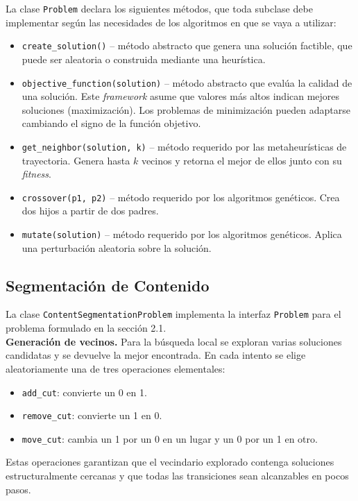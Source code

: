 \documentclass[letterpaper, 12pt]{report}
\begin{document}
La clase \texttt{Problem} declara los siguientes métodos, que toda subclase debe implementar según las necesidades de los algoritmos en que se vaya a utilizar:
\begin{itemize}
    \item \texttt{create\_solution()} -- método abstracto que genera una solución factible, que puede ser aleatoria o construida mediante una heurística.
    \item \texttt{objective\_function(solution)} -- método abstracto que evalúa la calidad de una solución. Este \textit{framework} asume que valores más altos indican mejores soluciones (maximización). Los problemas de minimización pueden adaptarse cambiando el signo de la función objetivo.
    \item \texttt{get\_neighbor(solution, k)} -- método requerido por las metaheurísticas de trayectoria. Genera hasta \(k\) vecinos y retorna el mejor de ellos junto con su \textit{fitness}.
    \item \texttt{crossover(p1, p2)} -- método requerido por los algoritmos genéticos. Crea dos hijos a partir de dos padres.
    \item \texttt{mutate(solution)} -- método requerido por los algoritmos genéticos. Aplica una perturbación aleatoria sobre la solución.
\end{itemize}


\subsection{Segmentación de Contenido}

La clase \texttt{ContentSegmentationProblem} implementa la interfaz 
\texttt{Problem} para el problema formulado en la sección 2.1. \\


\textbf{Generación de vecinos.}
Para la búsqueda local se exploran varias soluciones candidatas y se devuelve la mejor encontrada.
En cada intento se elige aleatoriamente una de tres operaciones elementales:
\begin{itemize}
    \item \texttt{add\_cut}: convierte un 0 en 1.
    \item \texttt{remove\_cut}: convierte un 1 en 0.
    \item \texttt{move\_cut}: cambia un 1 por un 0 en un lugar y un 0 por un 1 en otro.
\end{itemize}
Estas operaciones garantizan que el vecindario explorado contenga soluciones estructuralmente cercanas y que todas las transiciones sean alcanzables en pocos pasos. \\
\end{document}
